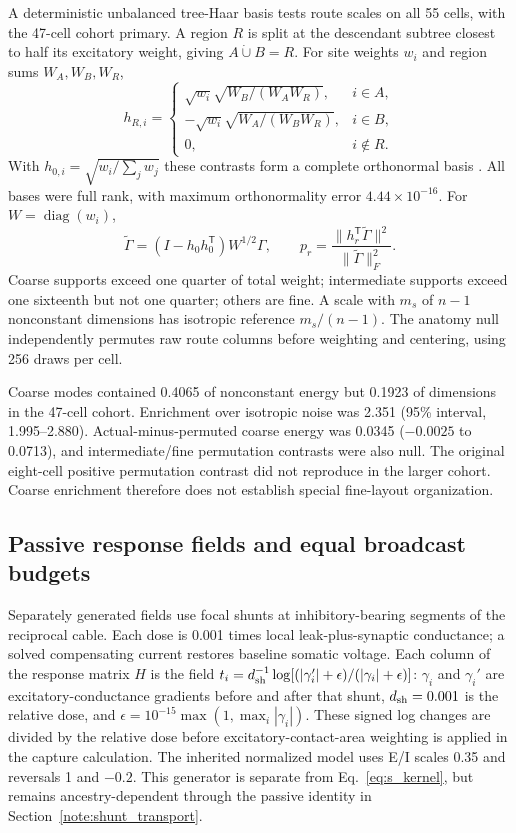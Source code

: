 A deterministic unbalanced tree-Haar basis tests route scales on all 55 cells, with the 47-cell cohort primary. A region $R$ is split at the descendant subtree closest to half its excitatory weight, giving $A\dot\cup B=R$. For site weights $w_i$ and region sums $W_A,W_B,W_R$,
\begin{equation}
 h_{R,i}=\begin{cases}
 \sqrt{w_i}\sqrt{W_B/(W_AW_R)},&i\in A,\\
 -\sqrt{w_i}\sqrt{W_A/(W_BW_R)},&i\in B,\\
 0,&i\notin R.
 \end{cases}
 \label{eq:s_irregular_haar}
\end{equation}
With $h_{0,i}=\sqrt{w_i/\sum_jw_j}$ these contrasts form a complete orthonormal basis \citep{gavish2010wavelets}. All bases were full rank, with maximum orthonormality error $4.44\times10^{-16}$. For $W=\operatorname{diag}(w_i)$,
\begin{equation}
 \widetilde\Gamma=(I-h_0h_0^{\mathsf T})W^{1/2}\Gamma,
 \qquad p_r=\frac{\|h_r^{\mathsf T}\widetilde\Gamma\|^2}
                       {\|\widetilde\Gamma\|_F^2}.
 \label{eq:s_irregular_wavelet_power}
\end{equation}
Coarse supports exceed one quarter of total weight; intermediate supports exceed one sixteenth but not one quarter; others are fine. A scale with $m_s$ of $n-1$ nonconstant dimensions has isotropic reference $m_s/(n-1)$. The anatomy null independently permutes raw route columns before weighting and centering, using 256 draws per cell.

Coarse modes contained 0.4065 of nonconstant energy but 0.1923 of dimensions in the 47-cell cohort. Enrichment over isotropic noise was 2.351 (95\% interval, 1.995--2.880). Actual-minus-permuted coarse energy was 0.0345 ($-0.0025$ to 0.0713), and intermediate/fine permutation contrasts were also null. The original eight-cell positive permutation contrast did not reproduce in the larger cohort. Coarse enrichment therefore does not establish special fine-layout organization.

\subsection{Passive response fields and equal broadcast budgets}
Separately generated fields use focal shunts at inhibitory-bearing segments of the reciprocal cable. Each dose is 0.001 times local leak-plus-synaptic conductance; a solved compensating current restores baseline somatic voltage. Each column of the response matrix $H$ is the field $t_i=d_{\rm sh}^{-1}\log[(|\gamma_i'|+\epsilon)/(|\gamma_i|+\epsilon)]$: $\gamma_i$ and $\gamma_i'$ are excitatory-conductance gradients before and after that shunt, $d_{\rm sh}=0.001$ is the relative dose, and $\epsilon=10^{-15}\max(1,\max_i|\gamma_i|)$. These signed log changes are divided by the relative dose before excitatory-contact-area weighting is applied in the capture calculation. The inherited normalized model uses E/I scales 0.35 and reversals 1 and $-0.2$. This generator is separate from Eq.~\ref{eq:s_kernel}, but remains ancestry-dependent through the passive identity in Section~\ref{note:shunt_transport}.

